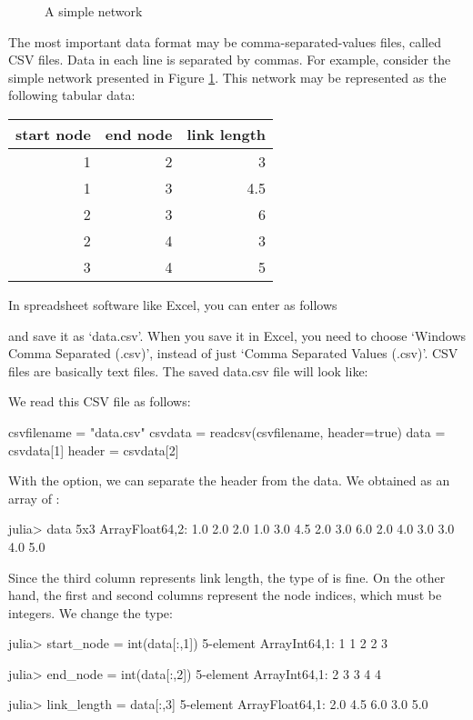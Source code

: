 \begin{figure}
\caption{A simple network\label{fig:example_net}}
\end{figure}


The most important data format may be comma-separated-values files, called CSV files. Data in each line is separated by commas. For example, consider the simple network presented in Figure \ref{fig:example_net}. This network may be represented as the following tabular data:

\begin{center}
\begin{tabular}{|r|r|r|}
\hline
start node & end node & link length \\
\hline
1 & 2 & 3\\
1 & 3 & 4.5\\
2 & 3 & 6 \\
2 & 4 & 3 \\
3 & 4 & 5 \\
\hline
\end{tabular}
\end{center}
In spreadsheet software like Excel, you can enter as follows
\begin{center}
\end{center}
and save it as `data.csv'. When you save it in Excel, you need to choose `Windows Comma Separated (.csv)', instead of just `Comma Separated Values (.csv)'. CSV files are basically text files. The saved data.csv file will look like:
\begin{codelisting}
\end{codelisting}
We read this CSV file as follows:
\begin{code}
csvfilename = "data.csv"
csvdata = readcsv(csvfilename,  header=true)
data = csvdata[1]
header = csvdata[2]
\end{code}
\noindent With the  option, we can separate the header from the data. We obtained  as an array of :
\begin{code}
julia> data
5x3 Array{Float64,2}:
 1.0  2.0  2.0
 1.0  3.0  4.5
 2.0  3.0  6.0
 2.0  4.0  3.0
 3.0  4.0  5.0
\end{code}
\noindent Since the third column represents link length, the type of  is fine. On the other hand, the first and second columns represent the node indices, which must be integers. We change the type:
\begin{code}
julia> start_node = int(data[:,1])
5-element Array{Int64,1}:
 1
 1
 2
 2
 3

julia> end_node = int(data[:,2])
5-element Array{Int64,1}:
 2
 3
 3
 4
 4

julia> link_length = data[:,3]
5-element Array{Float64,1}:
 2.0
 4.5
 6.0
 3.0
 5.0
\end{code}

